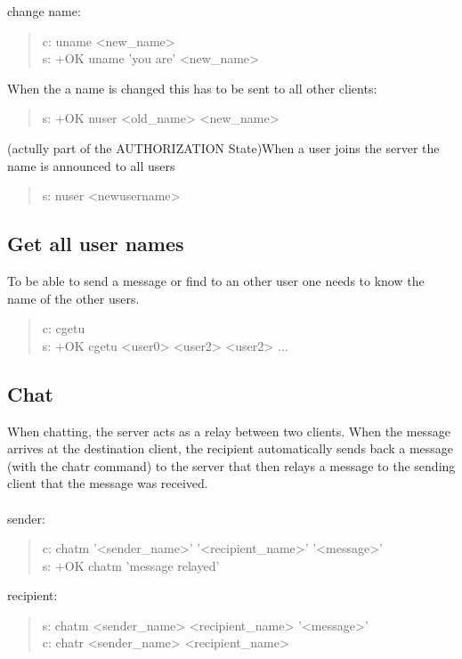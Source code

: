 \documentclass[a4paper,11pt]{article}
\begin{document}
\noindent
change name:
\begin{quote}
  c: uname <new\_name>\\
  s: +OK uname 'you are' <new\_name>
\end{quote}

\noindent
When the a name is changed this has to be sent to all other clients:\\
\begin{quote}
  s: +OK nuser <old\_name> <new\_name>
\end{quote}

\noindent
(actully part of the AUTHORIZATION State)When a user joins the server the name is announced to all users
\begin{quote}
  s: nuser <newusername> 
\end{quote}


\subsection{Get all user names}
To be able to send a message or find to an other user one needs to know the name of the other users.
\begin{quote}
  c: cgetu\\
  s: +OK cgetu <user0> <user2> <user2> ...
\end{quote} 

\subsection{Chat}
When chatting, the server acts as a relay between two clients. When the message arrives at the destination client, the recipient automatically sends back a message (with the chatr command) to the server that then relays a message to the sending client that the message was received.\\\\

\noindent
sender:
\begin{quote}
  c: chatm '<sender\_name>' '<recipient\_name>' '<message>'\\ %
  s: +OK chatm 'message relayed'
\end{quote}

\noindent
recipient:
\begin{quote}
  s: chatm <sender\_name> <recipient\_name> '<message>'\\
  c: chatr <sender\_name> <recipient\_name>%
\end{quote}
\clearpage
\end{document}
